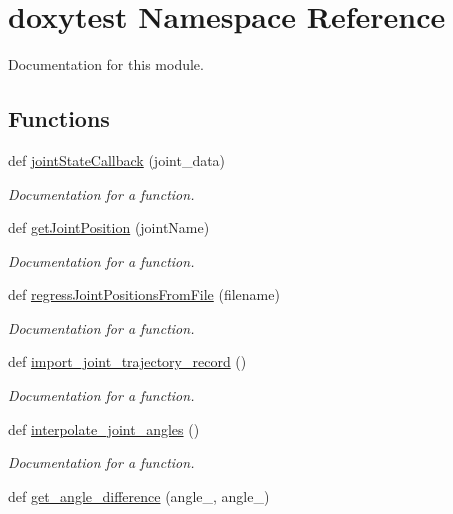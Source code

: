 \hypertarget{namespacedoxytest}{}\section{doxytest Namespace Reference}
\label{namespacedoxytest}


Documentation for this module.  


\subsection*{Functions}
\begin{DoxyCompactItemize}
\item 
def \mbox{\hyperlink{namespacedoxytest_a8b6bffa231b5da916bd22d3565fefb51}{joint\+State\+Callback}} (joint\+\_\+data)
\begin{DoxyCompactList}\small\item\em Documentation for a function. \end{DoxyCompactList}\item 
def \mbox{\hyperlink{namespacedoxytest_a39717765a109cab21b95b48231355036}{get\+Joint\+Position}} (joint\+Name)
\begin{DoxyCompactList}\small\item\em Documentation for a function. \end{DoxyCompactList}\item 
def \mbox{\hyperlink{namespacedoxytest_a86deb2d59740da764c4bf05ff28ec458}{regress\+Joint\+Positions\+From\+File}} (filename)
\begin{DoxyCompactList}\small\item\em Documentation for a function. \end{DoxyCompactList}\item 
def \mbox{\hyperlink{namespacedoxytest_a40d30f7062fff4fa63ea4d99c3fdef46}{import\+\_\+joint\+\_\+trajectory\+\_\+record}} ()
\begin{DoxyCompactList}\small\item\em Documentation for a function. \end{DoxyCompactList}\item 
def \mbox{\hyperlink{namespacedoxytest_a5fedae7205b3914d4d4321e795c66c5e}{interpolate\+\_\+joint\+\_\+angles}} ()
\begin{DoxyCompactList}\small\item\em Documentation for a function. \end{DoxyCompactList}\item 
def \mbox{\hyperlink{namespacedoxytest_aa52bf7bd569ae4aea6835e191e3568cc}{get\+\_\+angle\+\_\+difference}} (angle\+\_, angle\+\_)

\end{DoxyCompactItemize}
